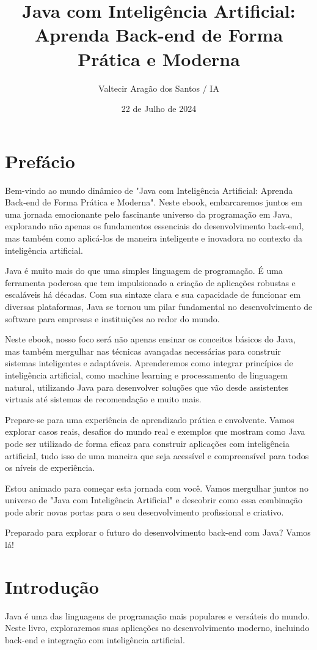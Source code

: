 \documentclass[a4paper,12pt]{book}
\title{Java com Inteligência Artificial: Aprenda Back-end de Forma Prática e Moderna}
\author{Valtecir Aragão dos Santos / IA}
\date{22 de Julho de 2024}
\begin{document}
\maketitle
\tableofcontents
\frontmatter
\chapter*{Prefácio}
Bem-vindo ao mundo dinâmico de "Java com Inteligência Artificial: Aprenda Back-end de Forma Prática e Moderna". Neste ebook, embarcaremos juntos em uma jornada emocionante pelo fascinante universo da programação em Java, explorando não apenas os fundamentos essenciais do desenvolvimento back-end, mas também como aplicá-los de maneira inteligente e inovadora no contexto da inteligência artificial.

Java é muito mais do que uma simples linguagem de programação. É uma ferramenta poderosa que tem impulsionado a criação de aplicações robustas e escaláveis há décadas. Com sua sintaxe clara e sua capacidade de funcionar em diversas plataformas, Java se tornou um pilar fundamental no desenvolvimento de software para empresas e instituições ao redor do mundo.

Neste ebook, nosso foco será não apenas ensinar os conceitos básicos do Java, mas também mergulhar nas técnicas avançadas necessárias para construir sistemas inteligentes e adaptáveis. Aprenderemos como integrar princípios de inteligência artificial, como machine learning e processamento de linguagem natural, utilizando Java para desenvolver soluções que vão desde assistentes virtuais até sistemas de recomendação e muito mais.

Prepare-se para uma experiência de aprendizado prática e envolvente. Vamos explorar casos reais, desafios do mundo real e exemplos que mostram como Java pode ser utilizado de forma eficaz para construir aplicações com inteligência artificial, tudo isso de uma maneira que seja acessível e compreensível para todos os níveis de experiência.

Estou animado para começar esta jornada com você. Vamos mergulhar juntos no universo de "Java com Inteligência Artificial" e descobrir como essa combinação pode abrir novas portas para o seu desenvolvimento profissional e criativo.

Preparado para explorar o futuro do desenvolvimento back-end com Java? Vamos lá!

\tableofcontents

\mainmatter
\chapter{Introdução}
Java é uma das linguagens de programação mais populares e versáteis do mundo. Neste livro, exploraremos suas aplicações no desenvolvimento moderno, incluindo back-end e integração com inteligência artificial.
\end{document}
